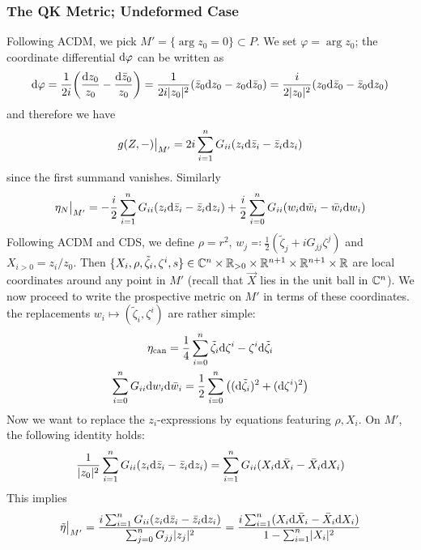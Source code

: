 \documentclass[parskip=half]{scrartcl}
\begin{document}
\subsubsection{The QK Metric; Undeformed Case}

Following ACDM, we pick $M'=\{\arg z_0=0\} \subset P$. We set $\varphi=\arg z_0$; the coordinate differential $\mathrm{d}\varphi$ can be written as
\begin{equation*}
	\mathrm{d} \varphi=\frac{1}{2i}\bigg(\frac{\mathrm{d} z_0}{z_0}-\frac{\mathrm{d} \bar z_0}{z_0}\bigg)=\frac{1}{2i\lvert z_0 \rvert^2}(\bar z_0\mathrm{d} z_0-z_0\mathrm{d}\bar z_0)=\frac{i}{2\lvert z_0 \rvert^2}(z_0\mathrm{d} \bar z_0-\bar z_0 \mathrm{d} z_0)
\end{equation*}
and therefore we have
\begin{equation*}
	g(Z,-)\big|_{M'}=2i\sum_{i=1}^n G_{ii}(z_i \mathrm{d} \bar z_i - \bar z_i \mathrm{d} z_i)
\end{equation*}
since the first summand vanishes. Similarly 
\begin{equation*}
	\eta_N\big|_{M'}=-\frac{i}{2}\sum_{i=1}^n G_{ii}(z_i \mathrm{d} \bar z_i - \bar z_i \mathrm{d} z_i)
	+\frac{i}{2}\sum_{i=0}^n G_{ii} (w_i \mathrm{d} \bar w_i -\bar w_i \mathrm{d} w_i)
\end{equation*}
Following ACDM and CDS, we define $\rho=r^2$, $w_j\eqqcolon \frac{1}{2}(\tilde \zeta_j+iG_{jj}\zeta^j)$ and $X_{i>0}=z_i/z_0$. Then $\{X_i,\rho,\tilde\zeta_i,\zeta^i,s\}\in \mathbb{C}^n \times \mathbb{R}_{>0}\times \mathbb{R}^{n+1}\times \mathbb{R}^{n+1}\times \mathbb{R}$ are local coordinates around any point in $M'$ (recall that $\vec X$ lies in the unit ball in $\mathbb{C}^n$). We now proceed to write the prospective metric on $M'$ in terms of these coordinates. the replacements $w_i\mapsto (\tilde\zeta_i,\zeta^i)$ are rather simple: 
\begin{gather*}
	\eta_\text{can}=\frac{1}{4}\sum_{i=0}^n \tilde \zeta_i \mathrm{d} \zeta^i-\zeta^i \mathrm{d} \tilde \zeta_i\\
	\sum_{i=0}^n G_{ii} \mathrm{d} w_i \mathrm{d} \bar w_i
	=\frac{1}{2}\sum_{i=0}^n \big((\mathrm{d} \tilde\zeta_i)^2+(\mathrm{d} \zeta^i)^2\big)
\end{gather*}
Now we want to replace the $z_i$-expressions by equations featuring $\rho,X_i$. On $M'$, the following identity holds:
\begin{equation*}
	\frac{1}{\lvert z_0 \rvert^2}\sum_{i=1}^n G_{ii} (z_i \mathrm{d} \bar z_i - \bar z_i \mathrm{d} z_i)
	=\sum_{i=1}^n G_{ii}(X_i \mathrm{d} \bar X_i - \bar X_i \mathrm{d} X_i)
\end{equation*}
This implies
\begin{equation*}
	\tilde\eta\big|_{M'}
	=\frac{i\sum_{i=1}^n G_{ii} (z_i \mathrm{d} \bar z_i - \bar z_i \mathrm{d} z_i)}{\sum_{j=0}^n G_{jj} \lvert z_j \rvert^2}\\
	=\frac{i\sum_{i=1}^n (X_i \mathrm{d} \bar X_i - \bar X_i \mathrm{d} X_i)}{1-\sum_{i=1}^n\lvert X_i \rvert^2}
\end{equation*}
\end{document}
